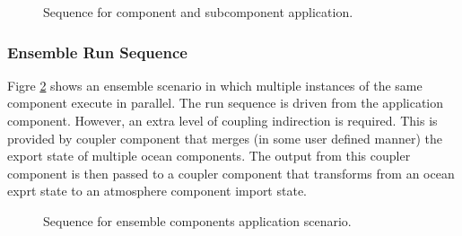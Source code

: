 \begin{figure}
\caption[{Subcomponent Run}]{Sequence for component and subcomponent
application.\\}
\label{fig:SubcomponentRunSequence}
\end{figure}


\subsubsection{Ensemble Run Sequence}
Figre \ref{fig:EnsembleComponentsRunSequence} shows an ensemble scenario
in which multiple instances of the same component execute in parallel.
The run sequence is driven from the application component. However,
an extra level of coupling indirection is required. This is provided by
coupler component that merges (in some user defined manner) the export
state of multiple ocean components. The output from this coupler
component is then passed to a coupler component that transforms from an
ocean exprt state to an
atmosphere component import state.
\begin{figure}
\caption[{Ensemble component Run}]{Sequence for ensemble components
application scenario.\\}
\label{fig:EnsembleComponentsRunSequence}
\end{figure}


